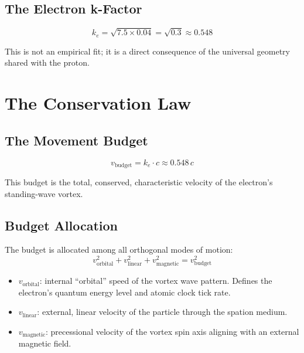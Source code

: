 \subsection{The Electron k-Factor}

\begin{equation}
  k_e = \sqrt{7.5 \times 0.04} = \sqrt{0.3} \approx 0.548
\end{equation}

This is not an empirical fit; it is a direct consequence of the universal geometry shared with the proton.


\section{The Conservation Law}

\subsection{The Movement Budget}

\begin{equation}\label{eq:budget}
  v_{\text{budget}} = k_e \cdot c \approx 0.548\,c
\end{equation}

This budget is the total, conserved, characteristic velocity of the electron's standing-wave vortex.

\subsection{Budget Allocation}

The budget is allocated among all orthogonal modes of motion:
\begin{equation}\label{eq:conservation}
  \boxed{v_{\text{orbital}}^2 + v_{\text{linear}}^2 + v_{\text{magnetic}}^2 = v_{\text{budget}}^2}
\end{equation}

\begin{itemize}
  \item $v_{\text{orbital}}$: internal ``orbital'' speed of the vortex wave pattern.  Defines the electron's quantum energy level and atomic clock tick rate.
  \item $v_{\text{linear}}$: external, linear velocity of the particle through the spation medium.
  \item $v_{\text{magnetic}}$: precessional velocity of the vortex spin axis aligning with an external magnetic field.
\end{itemize}

